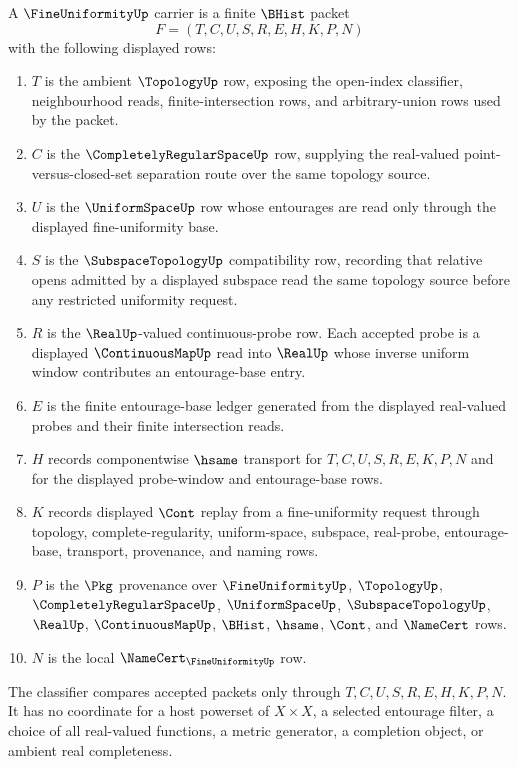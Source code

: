 \begin{definition}
\label{def:fine-uniformity-carrier}
A $\FineUniformityUp$ carrier is a finite $\BHist$ packet
$$
F=(T,C,U,S,R,E,H,K,P,N)
$$
with the following displayed rows:
\begin{enumerate}
\item $T$ is the ambient $\TopologyUp$ row, exposing the open-index classifier, neighbourhood reads, finite-intersection rows, and arbitrary-union rows used by the packet.
\item $C$ is the $\CompletelyRegularSpaceUp$ row, supplying the real-valued point-versus-closed-set separation route over the same topology source.
\item $U$ is the $\UniformSpaceUp$ row whose entourages are read only through the displayed fine-uniformity base.
\item $S$ is the $\SubspaceTopologyUp$ compatibility row, recording that relative opens admitted by a displayed subspace read the same topology source before any restricted uniformity request.
\item $R$ is the $\RealUp$-valued continuous-probe row. Each accepted probe is a displayed $\ContinuousMapUp$ read into $\RealUp$ whose inverse uniform window contributes an entourage-base entry.
\item $E$ is the finite entourage-base ledger generated from the displayed real-valued probes and their finite intersection reads.
\item $H$ records componentwise $\hsame$ transport for $T,C,U,S,R,E,K,P,N$ and for the displayed probe-window and entourage-base rows.
\item $K$ records displayed $\Cont$ replay from a fine-uniformity request through topology, complete-regularity, uniform-space, subspace, real-probe, entourage-base, transport, provenance, and naming rows.
\item $P$ is the $\Pkg$ provenance over $\FineUniformityUp$, $\TopologyUp$, $\CompletelyRegularSpaceUp$, $\UniformSpaceUp$, $\SubspaceTopologyUp$, $\RealUp$, $\ContinuousMapUp$, $\BHist$, $\hsame$, $\Cont$, and $\NameCert$ rows.
\item $N$ is the local $\NameCert_{\FineUniformityUp}$ row.
\end{enumerate}
The classifier compares accepted packets only through $T,C,U,S,R,E,H,K,P,N$. It has no coordinate for a host powerset of $X \times X$, a selected entourage filter, a choice of all real-valued functions, a metric generator, a completion object, or ambient real completeness.
\end{definition}

